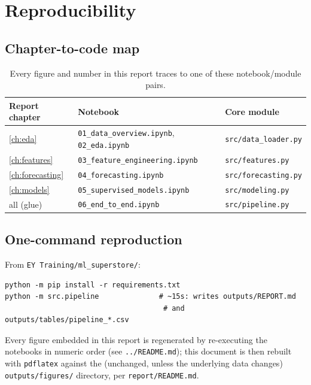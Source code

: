\appendix
\chapter{Reproducibility}
\label{app:repro}

\section{Chapter-to-code map}
\begin{table}[H]
  \centering
  \caption{Every figure and number in this report traces to one of these
  notebook/module pairs.}
  \label{tab:repro-map}
  \begin{tabular}{@{}lll@{}}
    \toprule
    Report chapter & Notebook & Core module \\
    \midrule
    \cref{ch:eda}         & \texttt{01\_data\_overview.ipynb}, \texttt{02\_eda.ipynb} & \texttt{src/data\_loader.py} \\
    \cref{ch:features}    & \texttt{03\_feature\_engineering.ipynb} & \texttt{src/features.py} \\
    \cref{ch:forecasting} & \texttt{04\_forecasting.ipynb} & \texttt{src/forecasting.py} \\
    \cref{ch:models}      & \texttt{05\_supervised\_models.ipynb} & \texttt{src/modeling.py} \\
    all (glue)             & \texttt{06\_end\_to\_end.ipynb} & \texttt{src/pipeline.py} \\
    \bottomrule
  \end{tabular}
\end{table}

\section{One-command reproduction}
From \texttt{EY Training/ml\_superstore/}:
\begin{lstlisting}
python -m pip install -r requirements.txt
python -m src.pipeline              # ~15s: writes outputs/REPORT.md
                                     # and outputs/tables/pipeline_*.csv
\end{lstlisting}
Every figure embedded in this report is regenerated by re-executing the
notebooks in numeric order (see \texttt{../README.md}); this document is
then rebuilt with \texttt{pdflatex} against the (unchanged, unless the
underlying data changes) \texttt{outputs/figures/} directory, per
\texttt{report/README.md}.

